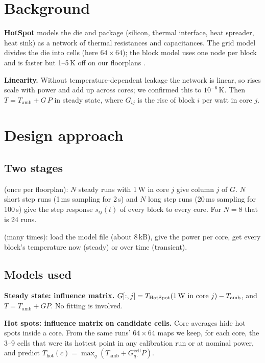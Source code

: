 \documentclass[11pt,a4paper]{article}
\begin{document}
\section{Background}
\textbf{HotSpot} \cite{hotspot} models the die and package (silicon, thermal interface, heat
spreader, heat sink) as a network of thermal resistances and capacitances. The grid model divides
the die into cells (here $64\times64$); the block model uses one node per block and is faster but
1--5\,K off on our floorplans \cite{hotspot4}.

\textbf{Linearity.} Without temperature-dependent leakage the network is linear, so rises scale
with power and add up across cores; we confirmed this to $10^{-6}$\,K. Then
$T = T_\text{amb} + G\,P$ in steady state, where $G_{ij}$ is the rise of block $i$ per watt in
core $j$.

\section{Design approach}

\subsection{Two stages}
\begin{description}[leftmargin=1.2em]
  \item[Calibration] (once per floorplan): $N$ steady runs with 1\,W in core $j$ give column $j$ of
        $G$. $N$ short step runs (1\,ms sampling for 2\,s) and $N$ long step runs (20\,ms sampling
        for 100\,s) give the step response $s_{ij}(t)$ of every block to every core. For $N=8$ that
        is 24 runs.
  \item[Prediction] (many times): load the model file (about 8\,kB), give the power per core, get
        every block's temperature now (steady) or over time (transient).
\end{description}

\subsection{Models used}
\textbf{Steady state: influence matrix.} $G[:,j] = T_\text{HotSpot}(\text{1\,W in core } j) -
T_\text{amb}$, and $T = T_\text{amb} + G P$. No fitting is involved.

\textbf{Hot spots: influence matrix on candidate cells.} Core averages hide hot spots inside a
core. From the same runs' $64\times64$ maps we keep, for each core, the 3--9 cells that were its
hottest point in any calibration run or at nominal power, and predict
$T_\text{hot}(c) = \max_{q} (T_\text{amb} + G^\text{cell}_{q\cdot} P)$.
\end{document}
